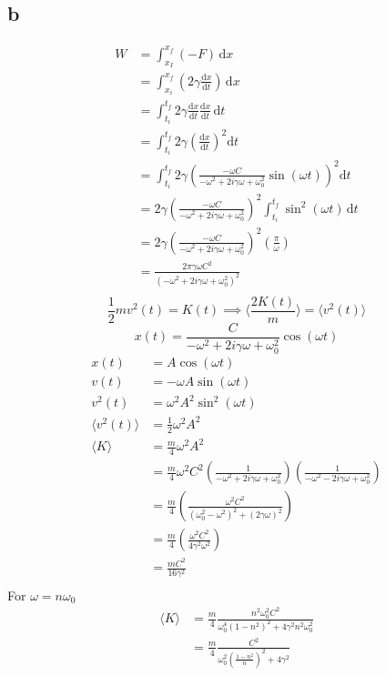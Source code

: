 \documentclass[12pt,letter]{article}
\begin{document}
\subsection*{b}
\begin{align*}
	W &= \int_{x_I}^{x_f} (-F) \, \mathrm{d} x  \\
	  &= \int_{x_i}^{x_f}   \left(2\gamma \frac{\mathrm{d} x}{\mathrm{d} t} \right) \, \mathrm{d} x \\
	  &= \int_{t_i}^{t_f}  2 \gamma \frac{\mathrm{d} x}{\mathrm{d} t} \frac{\mathrm{d} x}{\mathrm{d} t} \, \mathrm{d} t \\ 
	  &=  \int_{t_i}^{t_f} 2 \gamma \left(\frac{\mathrm{d} x}{\mathrm{d} t}\right)^2 \mathrm{d} t \\ &= \int_{t_i}^{t_f}   2 \gamma \left(\frac{ - \omega C}{- \omega ^2 + 2 i \gamma \omega + \omega_0^2  }  \sin(\omega t) \right)^2 \mathrm{d} t\\ 
	  &= 2 \gamma \left(\frac{ - \omega C}{- \omega^2 + 2 i \gamma \omega + \omega_0 ^2 } \right) ^2 \int_{t_i}^{t_f} \sin^2\left( \omega t \right) \, \mathrm{d} t  \\
	  &= 2 \gamma \left(\frac{  - \omega C}{- \omega^2 + 2 i \gamma \omega + \omega_0 ^2 } \right) ^2 
	  \left( \frac{\pi}{ \omega }\right) \\
	  &= \frac{ 2 \pi  \gamma \omega C^2 }{\left(- \omega ^2 + 2 i \gamma \omega + \omega_0^2\right)^2 } \\
\end{align*} 
\[
\frac{1}{2} m v^2(t) = K(t) \implies \Biggr\langle \frac{2 K(t)}{m} \Biggr\rangle = \langle v^2(t) \rangle 
\] 
\[
x(t) = \frac{C}{- \omega^2 + 2 i \gamma \omega + \omega_0^2} \cos(\omega t)
\]
\begin{align*}
x(t)	&=  A \cos \left( \omega t \right)\\
v(t) &= - \omega A \sin( \omega t) \\
v^2(t) &= \omega^2 A^2 \sin ^2 \left( \omega t\right) \\
\langle v^2 (t) \rangle &= \frac{1}{2 } \omega ^2 A ^2  \\
\langle K \rangle &= \frac{m}{4} \omega^2 A^2 \\ 
&= \frac{m}{4} \omega ^2 C^2 \left(\frac{1}{- \omega^2 + 2 i \gamma \omega + \omega_0^2} \right) \left(\frac{1}{- \omega^2 - 2 i \gamma \omega + \omega_0^2}\right)\\
&= \boxed{
 \frac{m}{4} \left(\frac{\omega ^2 C^2 }{(\omega_0^2 - \omega^2 )^2 + \left(2  \gamma \omega\right) ^2}\right) }\\
&=  	\frac{m}{4} \left(\frac{\omega ^2 C^2}{4 \gamma^2 \omega^2}\right) \tag{at resonance $\omega = \omega_0$} \\ &= \frac{m C^2}{16 \gamma^2 } \\
\end{align*}
For $\omega = n \omega_0$ 
\begin{align*}
	\langle K \rangle &= \frac{m}{4}
 \frac{n^2 \omega_0 ^2 C^2}{\omega_0^{4} \left(1 - n^2\right) ^2 + 4 \gamma^2 n^2 \omega_0 ^2}
	\\ &= \frac{m}{4} \frac{C^2}{\omega_0^2 \left(\frac{1 - n^2}{n}\right)^2 + 4 \gamma^2 } \\
\end{align*}
\end{document}
